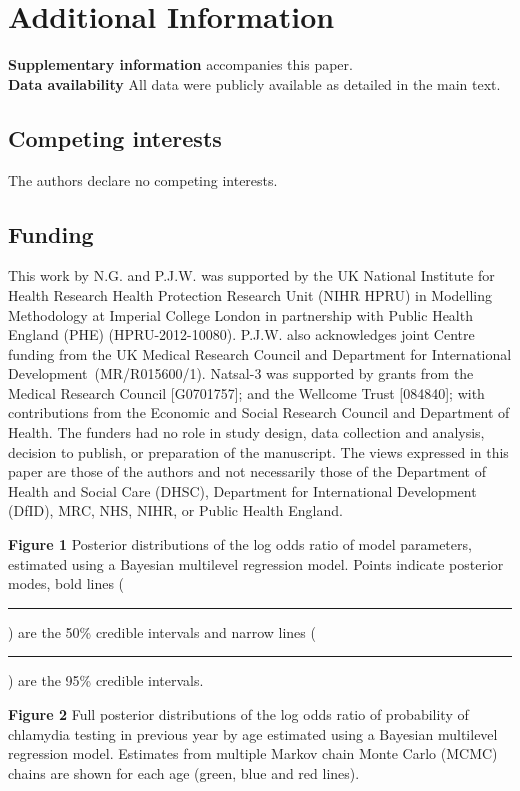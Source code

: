 \documentclass[fleqn,10pt]{wlscirep}
\begin{document}
\section*{Additional Information}
{\bf Supplementary information} accompanies this paper.\\
{\bf Data availability} All data were publicly available as detailed in the main text.

\subsection*{Competing interests}
The authors declare no competing interests.

\subsection*{Funding}
This work by N.G. and P.J.W. was supported by the UK National Institute for Health Research Health Protection Research Unit (NIHR HPRU) in Modelling Methodology at Imperial College London in partnership with Public Health England (PHE) (HPRU-2012-10080). P.J.W. also acknowledges joint Centre funding from the UK Medical Research Council and Department for International Development~(MR/R015600/1). Natsal-3 was supported by grants from the Medical Research Council [G0701757]; and the Wellcome Trust [084840]; with contributions from the Economic and Social Research Council and Department of Health.
The funders had no role in study design, data collection and analysis, decision to publish, or preparation of the manuscript. The views expressed in this paper are those of the authors and not necessarily those of the Department of Health and Social Care (DHSC), Department for International Development (DfID), MRC, NHS, NIHR, or Public Health England. 

\newpage

\textbf{Figure 1} Posterior distributions of the log odds ratio of model parameters, estimated using a Bayesian multilevel regression model. Points indicate posterior modes, bold lines (\rule[0.3ex]{0.3cm}{1.5pt}) are the 50\% credible intervals and narrow lines (\rule[0.3ex]{0.3cm}{0.5pt}) are the 95\% credible intervals.

\textbf{Figure 2} Full posterior distributions of the log odds ratio of probability of chlamydia testing in previous year by age estimated using a Bayesian multilevel regression model. Estimates from multiple Markov chain Monte Carlo (MCMC) chains are shown for each age (green, blue and red lines).
\end{document}
